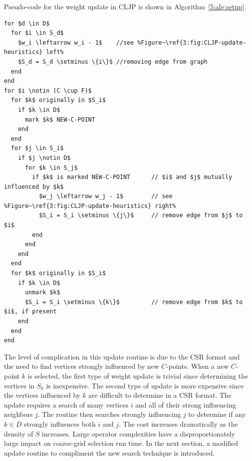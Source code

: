 \documentclass{elsart}
\begin{document}
Pseudo-code for the weight update in CLJP is shown in Algorithm~\ref{5:alg:setup}.
\begin{lstlisting}[caption={CLJP Weight Update for CSR Matrix},label=5:alg:setup]
%\textsc{Update-Weights}$(S,\, D,\, C,\, F,\, w)$%
for $d \in D$
  for $i \in S_d$
    $w_i \leftarrow w_i - 1$    //see %Figure~\ref{3:fig:CLJP-update-heuristics} left%
    $S_d = S_d \setminus \{i\}$ //removing edge from graph
  end
end
for $i \notin (C \cup F)$
  for $k$ originally in $S_i$
    if $k \in D$
      mark $k$ NEW-C-POINT
    end
  end
  for $j \in S_i$
    if $j \notin D$
      for $k \in S_j$
        if $k$ is marked NEW-C-POINT      // $i$ and $j$ mutually influenced by $k$
          $w_j \leftarrow w_j - 1$        // see %Figure~\ref{3:fig:CLJP-update-heuristics} right%
          $S_i = S_i \setminus \{j\}$     // remove edge from $j$ to $i$
        end
      end
    end
  end
  for $k$ originally in $S_i$
    if $k \in D$
      unmark $k$
      $S_i = S_i \setminus \{k\}$         // remove edge from $k$ to $i$, if present
    end
  end
end
\end{lstlisting}
The level of complication in this update routine is due to the CSR
format and the need to find vertices strongly influenced by new
$C$-points. When a new $C$-point $k$ is selected, the first type of
weight update is trivial since determining the vertices in $S_k$ is
inexpensive. The second type of update is more expensive since the
vertices influenced by $k$ are difficult to determine in a CSR
format. The update requires a search of many vertices $i$ and all of
their strong influencing neighbors $j$. The routine then searches
strongly influencing $j$ to determine if any $k \in D$ strongly
influences both $i$ and $j$. The cost increases dramatically as the
density of $S$ increases. Large operator complexities have a
disproportionately large impact on coarse-grid selection run time. In
the next section, a modified update routine to compliment the new
search technique is introduced.
\end{document}
